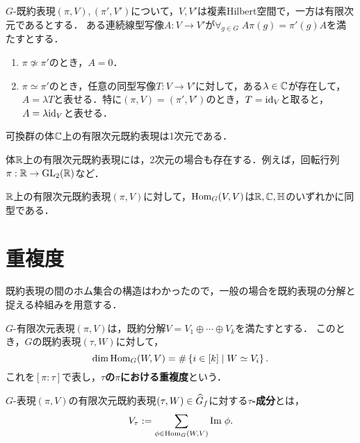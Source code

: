 \documentclass[uplatex,dvipdfmx]{jsreport}
\begin{document}
\begin{theorem}
    $G$-既約表現$(\pi,V),(\pi',V')$について，$V,V'$は複素Hilbert空間で，一方は有限次元であるとする．
    ある連続線型写像$A:V\to V'$が$\forall_{g\in G}\;A\pi(g)=\pi'(g)A$を満たすとする．
    \begin{enumerate}
        \item $\pi\not\simeq\pi'$のとき，$A=0$．
        \item $\pi\simeq\pi'$のとき，任意の同型写像$T:V\to V'$に対して，ある$\lambda\in\mathbb{C}$が存在して，$A=\lambda T$と表せる．特に$(\pi,V)=(\pi',V')$のとき，$T=\mathrm{id}_V$と取ると，$A=\lambda\mathrm{id}_V$と表せる．
    \end{enumerate}
\end{theorem}

\begin{corollary}
    可換群の体$\mathbb{C}$上の有限次元既約表現は1次元である．
\end{corollary}
\begin{remark}
    体$\mathbb{R}$上の有限次元既約表現には，2次元の場合も存在する．例えば，回転行列$\pi:\mathbb{R}\to\mathrm{GL}_2(\mathbb{R})$など．
\end{remark}

\begin{theorem}
    $\mathbb{R}$上の有限次元既約表現$(\pi,V)$に対して，$\mathrm{Hom}_G(V,V)$は$\mathbb{R},\mathbb{C},\mathbb{H}$のいずれかに同型である．
\end{theorem}

\section{重複度}

\begin{tcolorbox}[colframe=ForestGreen, colback=ForestGreen!10!white,breakable,colbacktitle=ForestGreen!40!white,coltitle=black,fonttitle=\bfseries\sffamily,
title=]
    既約表現の間のホム集合の構造はわかったので，一般の場合を既約表現の分解と捉える枠組みを用意する．
\end{tcolorbox}

\begin{theorem}[multiplicity]
    $G$-有限次元表現$(\pi,V)$は，既約分解$V=V_1\oplus\cdots\oplus V_k$を満たすとする．
    このとき，$G$の既約表現$(\tau,W)$に対して，
    \[\dim\mathrm{Hom}_G(W,V)=\#\left\{i\in[k]\mid W\simeq V_i\right\}.\]
    これを$[\pi:\tau]$で表し，\textbf{$\tau$の$\pi$における重複度}という．
\end{theorem}

\begin{definition}
    $G$-表現$(\pi,V)$の有限次元既約表現$(\tau,W)\in\widehat{G}_f$に対する\textbf{$\tau$-成分}とは，
    \[V_\tau:=\sum_{\phi\in\mathrm{Hom}_G(W,V)}\mathrm{Im}\;\phi.\]
\end{definition}
\end{document}
